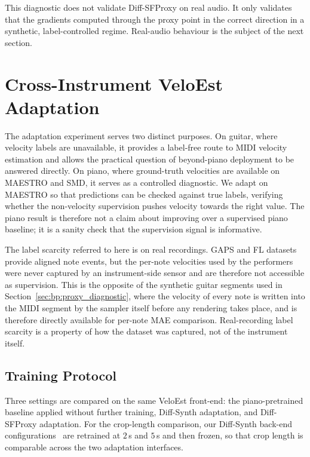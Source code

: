 This diagnostic does not validate Diff-SFProxy on real audio. It only validates that the gradients computed through the proxy point in the correct direction in a synthetic, label-controlled regime. Real-audio behaviour is the subject of the next section.

\section{Cross-Instrument VeloEst Adaptation}
\label{sec:bp:adaptation_results}

The adaptation experiment serves two distinct purposes. On guitar, where velocity labels are unavailable, it provides a label-free route to MIDI velocity estimation and allows the practical question of beyond-piano deployment to be answered directly. On piano, where ground-truth velocities are available on MAESTRO and SMD, it serves as a controlled diagnostic. We adapt on MAESTRO so that predictions can be checked against true labels, verifying whether the non-velocity supervision pushes velocity towards the right value. The piano result is therefore not a claim about improving over a supervised piano baseline; it is a sanity check that the supervision signal is informative.

The label scarcity referred to here is on real recordings. GAPS and FL datasets provide aligned note events, but the per-note velocities used by the performers were never captured by an instrument-side sensor and are therefore not accessible as supervision. This is the opposite of the synthetic guitar segments used in Section~\ref{sec:bp:proxy_diagnostic}, where the velocity of every note is written into the MIDI segment by the sampler itself before any rendering takes place, and is therefore directly available for per-note MAE comparison. Real-recording label scarcity is a property of how the dataset was captured, not of the instrument itself.

\subsection{Training Protocol}
\label{ssec:bp:adapt_train}

Three settings are compared on the same VeloEst front-end: the piano-pretrained baseline applied without further training, Diff-Synth adaptation, and Diff-SFProxy adaptation. For the crop-length comparison, our Diff-Synth back-end configurations~\cite{renault2023ddsp_piano,jonason2024guitar} are retrained at $2$\,s and $5$\,s and then frozen, so that crop length is comparable across the two adaptation interfaces.

